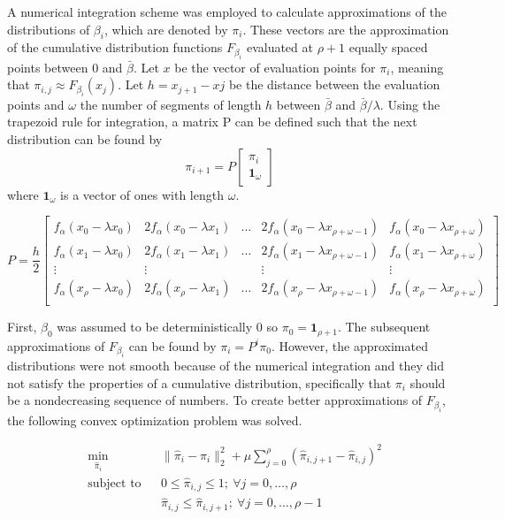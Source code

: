 \documentclass[12 pt]{report}
\begin{document}
A numerical integration scheme was employed to calculate approximations of the distributions of $\beta_i$, which are denoted by $\pi_i$. These vectors are the approximation of the cumulative distribution functions $F_{\beta_i}$ evaluated at $\rho+1$ equally spaced points between $0$ and $\bar{\beta}$. Let $x$ be the vector of evaluation points for $\pi_i$, meaning that $\pi_{i,j} \approx F_{\beta_i}(x_j)$. Let $h = x_{j+1} - x{j}$ be the distance between the evaluation points and $\omega$ the number of segments of length $h$ between $\bar{\beta}$ and $\bar{\beta}/\lambda$. Using the trapezoid rule for integration, a matrix P can be defined such that the next distribution can be found by  
$$\pi_{i+1} = P \begin{bmatrix}
\pi_i \\ \mathbf{1}_\omega
\end{bmatrix} $$ where $\mathbf{1}_\omega$ is a vector of ones with length $\omega$.

\begin{displaymath}
	P = \frac{h}{2}\begin{bmatrix}
		f_\alpha(x_0 - \lambda x_0) & 2f_\alpha(x_0 - \lambda x_1) & \dots & 2f_\alpha(x_0 - \lambda x_{\rho + \omega - 1}) & f_\alpha(x_0 - \lambda x_{\rho + \omega}) \\
		f_\alpha(x_1 - \lambda x_0) & 2f_\alpha(x_1 - \lambda x_1) & \dots & 2f_\alpha(x_1 - \lambda x_{\rho + \omega - 1}) & f_\alpha(x_1 - \lambda x_{\rho + \omega}) \\
		\vdots & \vdots & & \vdots & \vdots \\
		f_\alpha(x_\rho - \lambda x_0) & 2f_\alpha(x_\rho - \lambda x_1) & \dots & 2f_\alpha(x_\rho - \lambda x_{\rho + \omega - 1}) & f_\alpha(x_\rho - \lambda x_{\rho + \omega}) \\
	\end{bmatrix}
\end{displaymath}

 First, $\beta_0$ was assumed to be deterministically 0 so $\pi_0 = \mathbf{1}_{\rho + 1}$. The subsequent approximations of $F_{\beta_i}$ can be found by $\pi_i = P^i \pi_0$. However, the approximated distributions were not smooth because of the numerical integration and they did not satisfy the properties of a cumulative distribution, specifically that $\pi_i$ should be a nondecreasing sequence of numbers. To create better approximations of $F_{\beta_i}$, the following convex optimization problem was solved.
 
\begin{equation*}
\begin{aligned}
& \min_{\hat{\pi}_i} & & \|\hat{\pi}_i - \pi_i \|_2^2 + \mu \sum_{j = 0}^{\rho} (\hat{\pi}_{i,j+1} - \hat{\pi}_{i,j})^2\\
& \text{subject to} & & 0 \leq \hat{\pi}_{i,j} \leq 1; ~ \forall j = 0, \dots, \rho \\
& & & \hat{\pi}_{i,j} \leq \hat{\pi}_{i,j+1}; ~ \forall j = 0, \dots, \rho -1 \\
\end{aligned}
\end{equation*}
\end{document}
